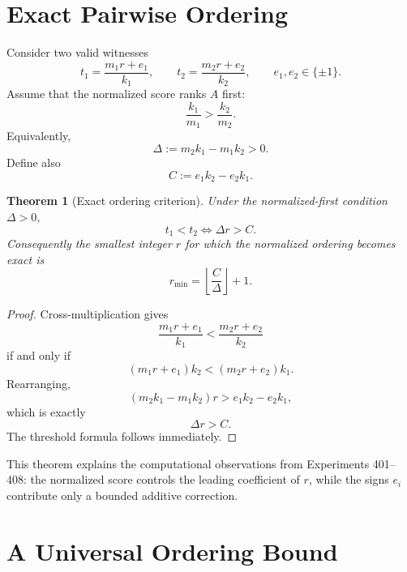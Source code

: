 \documentclass[11pt,a4paper]{article}
\newtheorem{theorem}{Theorem}
\begin{document}
\section{Exact Pairwise Ordering}

Consider two valid witnesses
\begin{equation}
    t_1=\frac{m_1r+e_1}{k_1},
    \qquad
    t_2=\frac{m_2r+e_2}{k_2},
    \qquad
    e_1,e_2\in\{\pm1\}.
\end{equation}
Assume that the normalized score ranks $A$ first:
\begin{equation}
    \frac{k_1}{m_1}>\frac{k_2}{m_2}.
\end{equation}
Equivalently,
\begin{equation}
    \Delta:=m_2k_1-m_1k_2>0.
\end{equation}
Define also
\begin{equation}
    C:=e_1k_2-e_2k_1.
\end{equation}

\begin{theorem}[Exact ordering criterion]
Under the normalized-first condition $\Delta>0$,
\begin{equation}
    \boxed{
    t_1<t_2
    \iff
    \Delta r>C.
    }
\end{equation}
Consequently the smallest integer $r$ for which the normalized ordering becomes exact is
\begin{equation}
    \boxed{
    r_{\min}
    =
    \left\lfloor\frac{C}{\Delta}\right\rfloor+1.
    }
\end{equation}
\end{theorem}

\begin{proof}
Cross-multiplication gives
\[
    \frac{m_1r+e_1}{k_1}
    <
    \frac{m_2r+e_2}{k_2}
\]
if and only if
\[
    (m_1r+e_1)k_2
    <
    (m_2r+e_2)k_1.
\]
Rearranging,
\[
    (m_2k_1-m_1k_2)r
    >e_1k_2-e_2k_1,
\]
which is exactly
\[
    \Delta r>C.
\]
The threshold formula follows immediately.
\end{proof}

This theorem explains the computational observations from Experiments 401--408: the normalized score controls the leading coefficient of $r$, while the signs $e_i$ contribute only a bounded additive correction.

\section{A Universal Ordering Bound}
\end{document}
